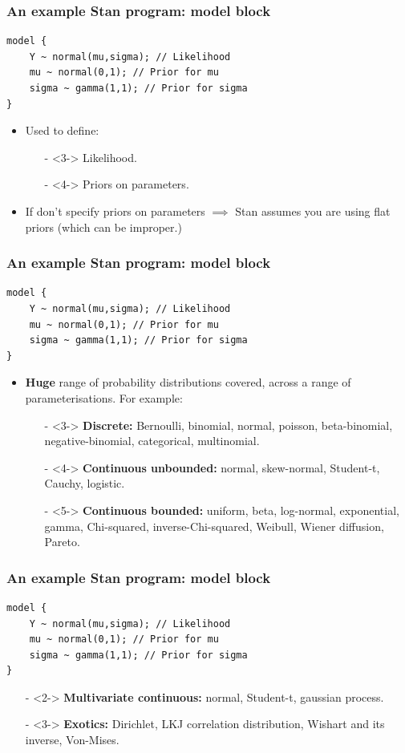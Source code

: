 \documentclass[handout]{beamer}
\begin{document}
\begin{frame}[fragile]
\frametitle{An example Stan program: model block}
\begin{verbatim}
model {
    Y ~ normal(mu,sigma); // Likelihood
    mu ~ normal(0,1); // Prior for mu
    sigma ~ gamma(1,1); // Prior for sigma
}
\end{verbatim}
\begin{itemize}
\item<2-> Used to define:
\begin{itemize}
\item[-]<3-> Likelihood.
\item[-]<4-> Priors on parameters.
\end{itemize}
\item<5-> If don't specify priors on parameters $\implies$ Stan assumes you are using flat priors (which can be improper.)
\end{itemize}

\end{frame}

\begin{frame}[fragile]
\frametitle{An example Stan program: model block}
\begin{verbatim}
model {
    Y ~ normal(mu,sigma); // Likelihood
    mu ~ normal(0,1); // Prior for mu
    sigma ~ gamma(1,1); // Prior for sigma
}
\end{verbatim}
\begin{itemize}
\item<2-> \textbf{Huge} range of probability distributions covered, across a range of parameterisations. For example: 
\begin{itemize}
\item[-]<3-> \textbf{Discrete:} Bernoulli, binomial,  normal, poisson, beta-binomial, negative-binomial, categorical, multinomial.
\item[-]<4-> \textbf{Continuous unbounded:} normal, skew-normal, Student-t, Cauchy, logistic.
\item[-]<5-> \textbf{Continuous bounded:} uniform, beta, log-normal, exponential, gamma, Chi-squared, inverse-Chi-squared, Weibull, Wiener diffusion, Pareto. 
\end{itemize}
\end{itemize}
\end{frame}

\begin{frame}[fragile]
\frametitle{An example Stan program: model block}
\begin{verbatim}
model {
    Y ~ normal(mu,sigma); // Likelihood
    mu ~ normal(0,1); // Prior for mu
    sigma ~ gamma(1,1); // Prior for sigma
}
\end{verbatim}
\begin{itemize}
\item[-]<2-> \textbf{Multivariate continuous:} normal, Student-t, gaussian process.
\item[-]<3-> \textbf{Exotics:} Dirichlet, LKJ correlation distribution, Wishart and its inverse, Von-Mises.
\end{itemize}
\end{frame}
\end{document}
